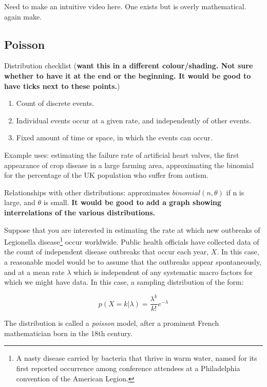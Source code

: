 \documentclass[11pt,fullpage]{book}
\begin{document}
 Need to make an intuitive video here. One exists but is overly mathematical.
 again make.

\subsection{Poisson}\label{sec:Distributions_poisson}
Distribution checklist (\textbf{want this in a different colour/shading. Not sure whether to have it at the end or the beginning. It would be good to have ticks next to these points.})

\begin{enumerate} 
\item Count of discrete events.
\item Individual events occur at a given rate, and independently of other events.
\item Fixed amount of time or space, in which the events can occur.
\end{enumerate}

Example uses: estimating the failure rate of artificial heart valves, the first appearance of crop disease in a large farming area, approximating the binomial for the percentage of the UK population who suffer from autism.

Relationships with other distributions: approximates $binomial(n,\theta)$ if n is large, and $\theta$ is small. \textbf{It would be good to add a graph showing interrelations of the various distributions.}

Suppose that you are interested in estimating the rate at which new outbreaks of Legionella disease\footnote{A nasty disease carried by bacteria that thrive in warm water, named for its first reported occurrence among conference attendees at a Philadelphia convention of the American Legion.} occur worldwide. Public health officials have collected data of the count of independent disease outbreaks that occur each year, $X$. In this case, a reasonable model would be to assume that the outbreaks appear spontaneously, and at a mean rate $\lambda$ which is independent of any systematic macro factors for which we might have data. In this case, a sampling distribution of the form:

\begin{equation}
p(X=k|\lambda) = \frac{\lambda^k}{k!} e^{-\lambda}
\end{equation}

The distribution is called a \textit{poisson} model, after a prominent French mathematician born in the 18th century.
\end{document}
